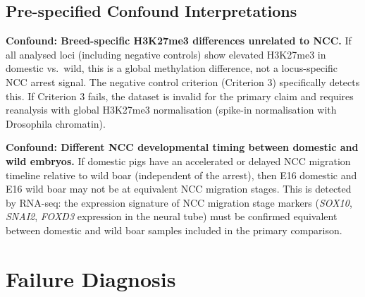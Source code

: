 \documentclass[10pt, a4paper]{article}
\begin{document}
\subsection{Pre-specified Confound
Interpretations}

\textbf{Confound: Breed-specific H3K27me3
differences unrelated to NCC.}
If all analysed loci (including negative
controls) show elevated H3K27me3 in domestic
vs.\ wild, this is a global methylation
difference, not a locus-specific NCC arrest
signal. The negative control criterion
(Criterion 3) specifically detects this.
If Criterion 3 fails, the dataset is invalid
for the primary claim and requires
reanalysis with global H3K27me3
normalisation (spike-in normalisation
with Drosophila chromatin).

\textbf{Confound: Different NCC developmental
timing between domestic and wild embryos.}
If domestic pigs have an accelerated or
delayed NCC migration timeline relative
to wild boar (independent of the arrest),
then E16 domestic and E16 wild boar
may not be at equivalent NCC migration
stages. This is detected by RNA-seq:
the expression signature of NCC migration
stage markers (\textit{SOX10}, \textit{SNAI2},
\textit{FOXD3} expression in the neural tube)
must be confirmed equivalent between
domestic and wild boar samples included
in the primary comparison.

\section{Failure Diagnosis}
\label{sec:failure}
\end{document}
